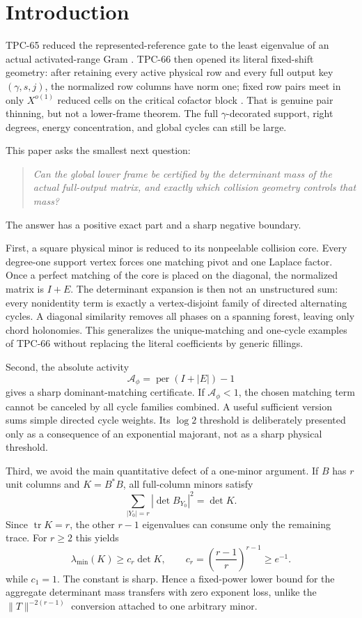 \section{Introduction}

TPC-65 reduced the represented-reference gate to the least eigenvalue of an
actual activated-range Gram \citep{WangTPC65}. TPC-66 then opened its literal
fixed-shift geometry: after retaining every active physical row and every full
output key \((\gamma,s,j)\), the normalized row columns have norm one; fixed
row pairs meet in only \(X^{o(1)}\) reduced cells on the critical cofactor
block \citep{WangTPC66}. That is genuine pair thinning, but not a lower-frame
theorem. The full \(\gamma\)-decorated support, right degrees, energy
concentration, and global cycles can still be large.

This paper asks the smallest next question:
\begin{quote}
\emph{Can the global lower frame be certified by the determinant mass of the
actual full-output matrix, and exactly which collision geometry controls that
mass?}
\end{quote}
The answer has a positive exact part and a sharp negative boundary.

First, a square physical minor is reduced to its nonpeelable collision core.
Every degree-one support vertex forces one matching pivot and one Laplace
factor. Once a perfect matching of the core is placed on the diagonal, the
normalized matrix is \(I+E\). The determinant expansion is then not an
unstructured sum: every nonidentity term is exactly a vertex-disjoint family
of directed alternating cycles. A diagonal similarity removes all phases on a
spanning forest, leaving only chord holonomies. This generalizes the
unique-matching and one-cycle examples of TPC-66 without replacing the literal
coefficients by generic fillings.

Second, the absolute activity
\[
 \mathcal A_\phi=\operatorname{per}(I+|E|)-1
\]
gives a sharp dominant-matching certificate. If
\(\mathcal A_\phi<1\), the chosen matching term cannot be canceled by all
cycle families combined. A useful sufficient version sums simple directed
cycle weights. Its \(\log 2\) threshold is deliberately presented only as a
consequence of an exponential majorant, not as a sharp physical threshold.

Third, we avoid the main quantitative defect of a one-minor argument.
If \(B\) has \(r\) unit columns and \(K=B^*B\), all full-column minors satisfy
\[
 \sum_{|Y_0|=r}|\det B_{Y_0}|^2=\det K.
\]
Since \(\operatorname{tr}K=r\), the other \(r-1\) eigenvalues can consume only
the remaining trace. For \(r\ge2\) this yields
\[
 \lambda_{\min}(K)
 \ge
 c_r\det K,
 \qquad
 c_r=\left(\frac{r-1}{r}\right)^{r-1}\ge e^{-1}.
\]
while \(c_1=1\). The constant is sharp. Hence a fixed-power lower bound for the aggregate
determinant mass transfers with zero exponent loss, unlike the
\(\|T\|^{-2(r-1)}\) conversion attached to one arbitrary minor.


